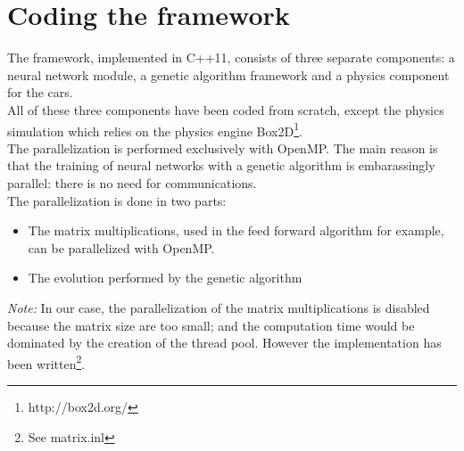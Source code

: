 \documentclass{acm_proc_article-sp}
\begin{document}
\section{Coding the framework}

The framework, implemented in C++11, consists of three separate components: a neural network module, a genetic algorithm framework and a physics component for the cars.\\
All of these three components have been coded from scratch, except the physics simulation which relies on the physics engine Box2D\footnote{http://box2d.org/}. \\

\noindent
The parallelization is performed exclusively with OpenMP. The main reason is that the training of neural networks with  a genetic algorithm is embarassingly parallel: there is no need for communications. \\

\noindent
The parallelization is done in two parts:
\begin{itemize}
	\item The matrix multiplications, used in the feed forward  algorithm for example, can be parallelized with OpenMP.
	\item The evolution performed by the genetic algorithm
\end{itemize}
\textit{Note:} In our case, the parallelization of the matrix multiplications is disabled because the matrix size are too small; and the computation time would be dominated by the creation of the thread pool. However the implementation has been written\footnote{See matrix.inl}. \\
\end{document}
